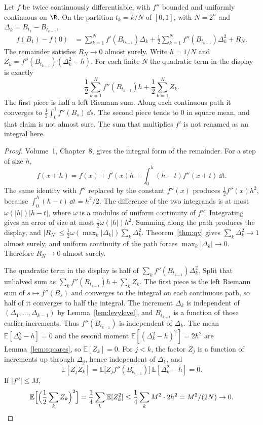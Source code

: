 \begin{theorem}\label{thm:dyadicito}
Let $f$ be twice continuously differentiable, with $f''$ bounded and uniformly continuous on $\R$. On the partition $t_k=k/N$ of $[0,1]$, with $N=2^n$ and $\Delta_k=B_{t_k}-B_{t_{k-1}}$,
\begin{align*}
 f(B_1)-f(0)
 &=\sum_{k=1}^N f'(B_{t_{k-1}})\Delta_k
 +\frac12\sum_{k=1}^N f''(B_{t_{k-1}})\Delta_k^2
 +R_N.
\end{align*}
The remainder satisfies $R_N\to0$ almost surely. Write $h=1/N$ and $Z_k=f''(B_{t_{k-1}})(\Delta_k^2-h)$. For each finite $N$ the quadratic term in the display is exactly
\[
 \frac12\sum_{k=1}^N f''(B_{t_{k-1}})h+\frac12\sum_{k=1}^N Z_k.
\]
The first piece is half a left Riemann sum. Along each continuous path it converges to $\frac12\int_0^1 f''(B_s)\,\dd s$. The second piece tends to $0$ in square mean, and that claim is not almost sure. The sum that multiplies $f'$ is not renamed as an integral here.
\end{theorem}
\begin{proof}
Volume~1, Chapter~8, gives the integral form of the remainder. For a step of size $h$,
\[
 f(x+h)=f(x)+f'(x)h+\int_0^h(h-t)f''(x+t)\,\dd t.
\]
The same identity with $f''$ replaced by the constant $f''(x)$ produces $\tfrac12 f''(x)h^2$, because $\int_0^h(h-t)\,\dd t=h^2/2$. The difference of the two integrands is at most $\omega(|h|)|h-t|$, where $\omega$ is a modulus of uniform continuity of $f''$. Integrating gives an error of size at most $\tfrac12\omega(|h|)h^2$. Summing along the path produces the display, and $|R_N|\le\tfrac12\omega(\max_k|\Delta_k|)\sum_k\Delta_k^2$. Theorem~\ref{thm:qv} gives $\sum_k\Delta_k^2\to1$ almost surely, and uniform continuity of the path forces $\max_k|\Delta_k|\to0$. Therefore $R_N\to0$ almost surely.

The quadratic term in the display is half of $\sum_k f''(B_{t_{k-1}})\Delta_k^2$. Split that unhalved sum as $\sum_k f''(B_{t_{k-1}})h+\sum_k Z_k$. The first piece is the left Riemann sum of $s\mapsto f''(B_s)$ and converges to the integral on each continuous path, so half of it converges to half the integral. The increment $\Delta_k$ is independent of $(\Delta_1,\ldots,\Delta_{k-1})$ by Lemma~\ref{lem:levylevel}, and $B_{t_{k-1}}$ is a function of those earlier increments. Thus $f''(B_{t_{k-1}})$ is independent of $\Delta_k$. The mean $\mathbb E[\Delta_k^2-h]=0$ and the second moment $\mathbb E[(\Delta_k^2-h)^2]=2h^2$ are Lemma~\ref{lem:squares}, so $\mathbb E[Z_k]=0$. For $j<k$, the factor $Z_j$ is a function of increments up through $\Delta_j$, hence independent of $\Delta_k$, and
\[
 \mathbb E[Z_j Z_k]=\mathbb E\bigl[Z_j f''(B_{t_{k-1}})\bigr]\,\mathbb E[\Delta_k^2-h]=0.
\]
If $|f''|\le M$,
\[
 \mathbb E\Bigl[\Bigl(\frac12\sum_k Z_k\Bigr)^2\Bigr]
 =\frac14\sum_k\mathbb E[Z_k^2]
 \le\frac14\sum_k M^2\cdot 2h^2
 =M^2/(2N)\to0.
\]
\end{proof}

